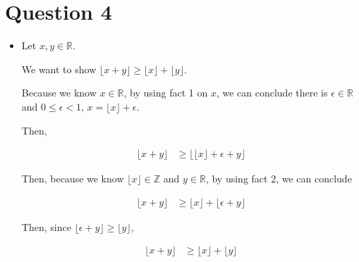 \documentclass[12pt]{article}
\begin{document}
\section*{Question 4}
\begin{itemize}
    \item

    Let $x,y \in \mathbb{R}$.

    \bigskip

    We want to show $\lfloor x + y \rfloor \geq \lfloor x \rfloor + \lfloor y \rfloor$.

    \bigskip

    Because we know $x \in \mathbb{R}$, by using fact 1 on $x$, we can conclude there
    is $\epsilon \in \mathbb{R}$ and $0 \leq \epsilon < 1$, $x = \lfloor x \rfloor + \epsilon$.

    \bigskip

    Then,

    \setcounter{equation}{0}
    \begin{align}
        \lfloor x + y \rfloor &\geq \bigl\lfloor \lfloor x \rfloor + \epsilon + y \bigr\rfloor
    \end{align}

    \bigskip

    Then, because we know $\lfloor x \rfloor \in \mathbb{Z}$ and $y \in \mathbb{R}$,
    by using fact 2, we can conclude

    \begin{align}
        \lfloor x + y \rfloor &\geq \lfloor x \rfloor + \lfloor \epsilon + y \rfloor
    \end{align}

    \bigskip

    Then, since $\lfloor \epsilon + y \rfloor \geq \lfloor y \rfloor$,

    \begin{align}
        \lfloor x + y \rfloor &\geq \lfloor x \rfloor + \lfloor y \rfloor
    \end{align}

\end{itemize}
\end{document}
